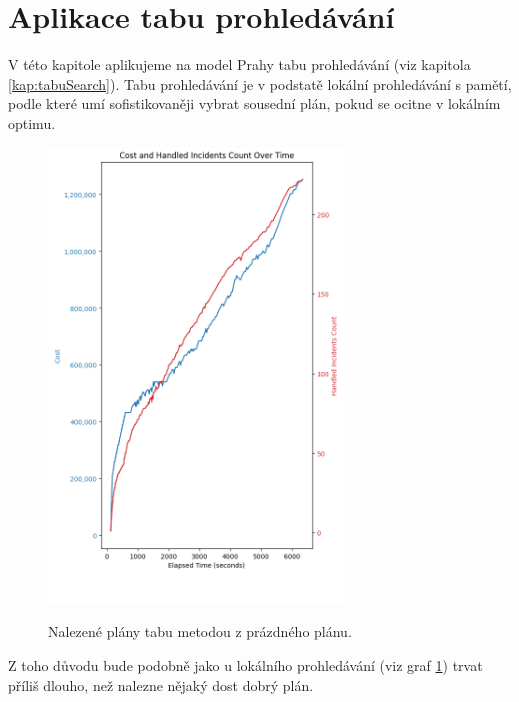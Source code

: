 \section{Aplikace tabu prohledávání}

V této kapitole aplikujeme na model Prahy tabu prohledávání (viz kapitola \ref{kap:tabuSearch}).
Tabu prohledávání je v podstatě lokální prohledávání s pamětí, podle které umí sofistikovaněji vybrat sousední plán,
pokud se ocitne v lokálním optimu.

\begin{figure}[H]
  \caption{Nalezené plány tabu metodou z prázdného plánu.}
  \includegraphics[width=0.7\textwidth,height=0.9\textwidth]{img/plots/tabuSearch_empty.png}
  \centering
  \label{img:empty_tabu}
\end{figure}

Z toho důvodu bude podobně jako u lokálního prohledávání (viz graf \ref{img:empty_tabu}) trvat příliš dlouho, než nalezne nějaký dost dobrý plán.

